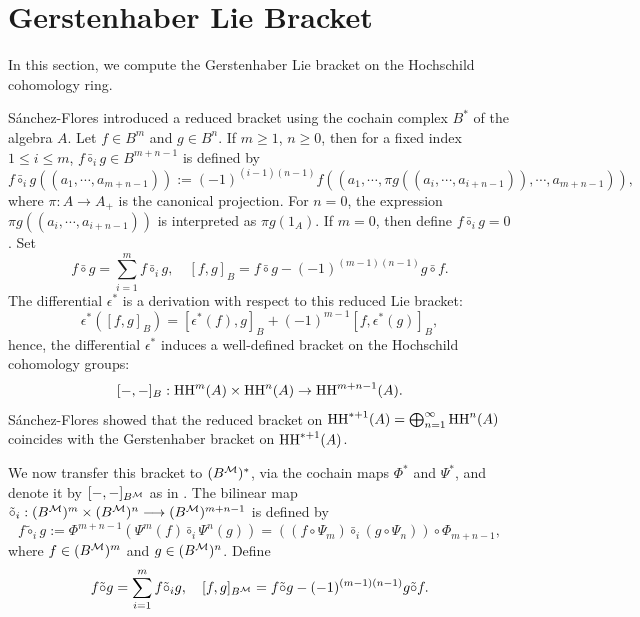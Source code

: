 \documentclass[10pt, reqno]{amsart}
\theoremstyle{definition}
\theoremstyle{remark}
\numberwithin{equation}{section}
\begin{document}

\section{Gerstenhaber Lie Bracket}\label{Section: Gerstenhaber Lie Bracket}


In this section, we compute the Gerstenhaber Lie bracket on the Hochschild cohomology ring.



S\'anchez-Flores \cite{SF08} introduced a reduced bracket using the cochain complex \(B^*\) of the algebra \(A\). Let \(f\in B^m \) and \(g\in B^n\). If \(m\ge 1\), \( n\ge 0\), then for a fixed index \(1\le i \le m\), $f \bar{\circ}_i g \in B^{m+n-1}$ is defined by 
\[f \bar{\circ}_i g ((a_1, \cdots , a_{m+n-1})) :=  (-1)^{(i-1)(n-1)}f((a_1, \cdots , \pi g((a_i, \cdots , a_{i+n-1})), \cdots , a_{m+n-1})),\]
where \(\pi: A\to A_+\) is the canonical projection. For \( n = 0 \), the expression \(\pi g((a_i, \cdots , a_{i+n-1}))\) is interpreted as \(\pi g(1_A)\). If $m=0$, then define $f \bar{\circ}_i g=0$. Set
\[f \bar{\circ} g = \sum_{i=1}^{m} f \bar{\circ}_i g, \quad [f, g]_B = f \bar{\circ} g - (-1)^{(m-1)(n-1)} g \bar{\circ} f. \]
The differential \(\epsilon^*\) is a  derivation with respect to  this reduced Lie bracket:
\[ \epsilon^*([f,g]_B) = [\epsilon^*(f), g]_B + (-1)^{m-1}[f, \epsilon^*(g)]_B, \]
hence, the differential $\epsilon^*$ induces a well-defined bracket on the Hochschild cohomology groups:
\[[-,-]_B: \mathrm{HH}^m(A) \times \mathrm{HH}^n(A) \to \mathrm{HH}^{m+n-1}(A).\]
S\'anchez-Flores showed that the reduced bracket on
\(\mathrm{HH}^{*+1}(A)= \bigoplus_{n=1}^{\infty} \mathrm{HH}^n(A)\) coincides with the Gerstenhaber bracket on \(\mathrm{HH}^{*+1}(A)\).

We now transfer this bracket to \((B^{\mathcal{M}})^*\), via the cochain maps \(\Phi^*\) and \(\Psi^*\), and denote it by \([-, -]_{B^{\mathcal{M}}}\) as in \cite{BIKLZ26}. The bilinear map
\(\tilde{\circ}_i : (B^{\mathcal{M}})^m \times (B^{\mathcal{M}})^n \longrightarrow (B^{\mathcal{M}})^{m+n-1}\)
is defined by 
\[f \tilde{\circ}_i g := \Phi^{m+n-1}(\Psi^m(f) \bar{\circ}_i \Psi^n(g))=((f\circ\Psi_m) \bar{\circ}_i (g\circ\Psi_n))\circ\Phi_{m+n-1},\]
where \(f\in (B^{\mathcal{M}})^m \) and \(g\in (B^{\mathcal{M}})^n\). Define
\[f \tilde{\circ} g = \sum_{i=1}^{m} f \tilde{\circ}_i g, \quad [f, g]_{B^{\mathcal{M}}} = f \tilde{\circ} g - (-1)^{(m-1)(n-1)} g \tilde{\circ} f.\]
\end{document}
